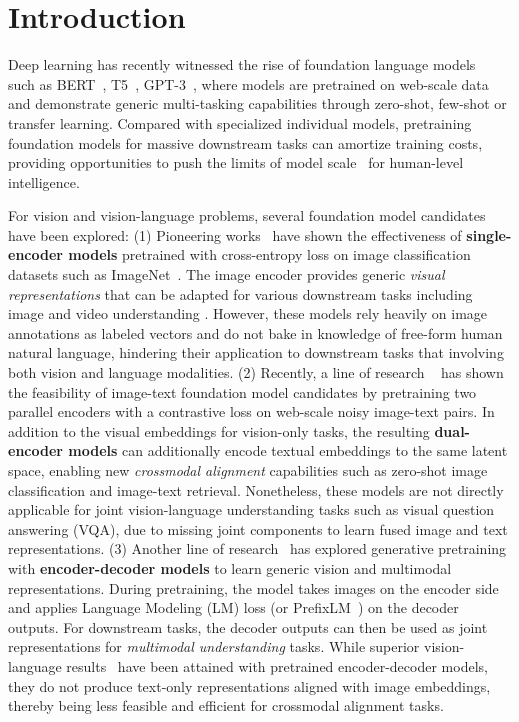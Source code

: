 \section{Introduction}
Deep learning has recently witnessed the rise of foundation language models~\cite{bommasani2021opportunities} such as BERT~\cite{devlin2018bert}, T5~\cite{raffel2019exploring}, GPT-3~\cite{brown2020language}, where models are pretrained on web-scale data and demonstrate generic multi-tasking capabilities through zero-shot, few-shot or transfer learning. Compared with specialized individual models, pretraining foundation models for massive downstream tasks can amortize training costs, providing opportunities to push the limits of model scale~\cite{barham2022pathways} for human-level intelligence.

For vision and vision-language problems, several foundation model candidates have been explored:
(1) Pioneering works~\cite{girshick2014rich, long2015fully, simonyan2014two} have shown the effectiveness of \textbf{single-encoder models} pretrained with cross-entropy loss on image classification datasets such as ImageNet~\cite{deng2009imagenet}.
The image encoder provides generic \textit{visual representations} that can be adapted for various downstream tasks including image and video understanding \citep{dai2021coatnet,zhang2021co}.
However, these models rely heavily on image annotations as labeled vectors and do not bake in knowledge of free-form human natural language,
hindering their application to downstream tasks that involving both vision and language modalities.
(2) Recently,
a line of research ~\cite{radford2021learning, jia2021scaling, yuan2021florence}
has shown the feasibility of image-text foundation model candidates by pretraining two parallel encoders with a contrastive loss on web-scale noisy image-text pairs.
In addition to the visual embeddings for vision-only tasks,
the resulting \textbf{dual-encoder models} can additionally encode textual embeddings to the same latent space,
enabling new \textit{crossmodal alignment} capabilities such as zero-shot image classification and image-text retrieval.
Nonetheless, these models are not directly applicable for joint vision-language understanding tasks such as visual question answering (VQA), due to missing joint components to learn fused image and text representations.
(3) Another line of research~\cite{vinyals2015show, wang2021simvlm, wang2022unifying} has explored generative pretraining with \textbf{encoder-decoder models} to learn generic vision and multimodal representations. 
During pretraining, the model takes images on the encoder side and applies Language Modeling (LM) loss (or PrefixLM~\cite{raffel2019exploring, wang2021simvlm}) on the decoder outputs.
For downstream tasks, the decoder outputs can then be used as joint representations for \textit{multimodal understanding} tasks.
While superior vision-language results~\cite{wang2021simvlm} have been attained with pretrained encoder-decoder models,
they do not produce text-only representations aligned with image embeddings,
thereby being less feasible and efficient for crossmodal alignment tasks.

